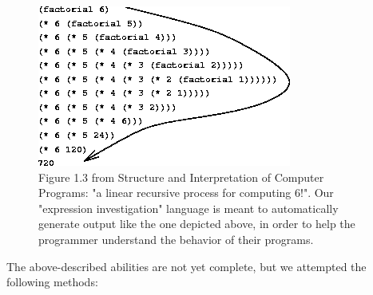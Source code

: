 \documentclass[10pt,journal,compsoc]{IEEEtran}
\begin{document}
        \begin{figure}
            \includegraphics[width=\linewidth]{SICP-fig-1.3.gif}
            \caption{Figure 1.3 from Structure and Interpretation of Computer Programs: "a linear recursive process for computing 6!". Our "expression investigation" language is meant to automatically generate output like the one depicted above, in order to help the programmer understand the behavior of their programs.}
            \label{fig:overview}
        \end{figure}

		The above-described abilities are not yet complete, but we attempted the following methods:
\end{document}

